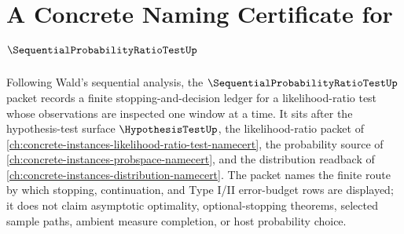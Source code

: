 \chapter{A Concrete Naming Certificate for $\SequentialProbabilityRatioTestUp$}
\label{ch:concrete-instances-sequential-probability-ratio-test-namecert}

Following Wald's sequential analysis, the $\SequentialProbabilityRatioTestUp$ packet records a finite stopping-and-decision ledger for a likelihood-ratio test whose observations are inspected one window at a time. It sits after the hypothesis-test surface $\HypothesisTestUp$, the likelihood-ratio packet of \autoref{ch:concrete-instances-likelihood-ratio-test-namecert}, the probability source of \autoref{ch:concrete-instances-probspace-namecert}, and the distribution readback of \autoref{ch:concrete-instances-distribution-namecert}. The packet names the finite route by which stopping, continuation, and Type I/II error-budget rows are displayed; it does not claim asymptotic optimality, optional-stopping theorems, selected sample paths, ambient measure completion, or host probability choice.

